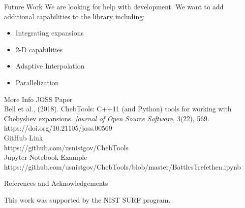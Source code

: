 \documentclass[final]{beamer}
\begin{document}
\begin{frame}[fragile]{}
\begin{columns}[t]
\begin{column}{.31\linewidth}
\begin{block}{Future Work}
We are looking for help with development. We want to add additional capabilities to the library including:
\begin{itemize}
\item Integrating expansions
\item 2-D capabilities
\item Adaptive Interpolation
\item Parallelization
\end{itemize}
\end{block}

\begin{block}{More Info}
{\color{numhypRed} JOSS Paper}\\
Bell et al., (2018). ChebTools: C++11 (and Python) tools for working with Chebyshev expansions. {\it ]ournal of Open Source Software}, 3(22), 569. https://doi.org/10.21105/joss.00569\\
{\color{numhypRed} GitHub Link }\\
https://github.com/usnistgov/ChebTools\\
{\color{numhypRed} Jupyter Notebook Example}\\
{\small https://github.com/usnistgov/ChebTools/blob/master/BattlesTrefethen.ipynb}
\end{block}

\begin{block}{References and Acknowledgements}

\scriptsize{}
\bigskip
{\normalsize This work was supported by the NIST SURF program.}
\end{block}
\end{column}
  \end{columns}
\end{frame}
\end{document}
